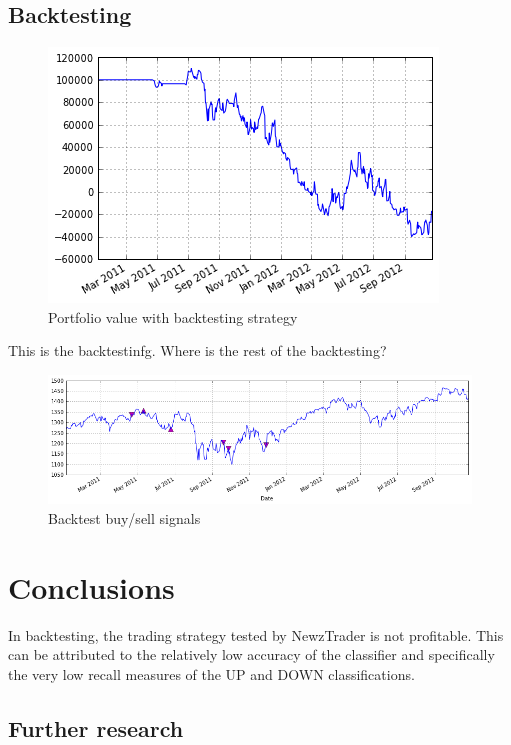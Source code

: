 \documentclass[]{article}
\begin{document}
\subsection{Backtesting}
\begin{figure}
\centering
\includegraphics[scale=0.6]{paper/img/backtestPortValue.png}
\caption{Portfolio value with backtesting strategy}
\end{figure}

This is the backtestinfg. Where is the rest of the backtesting?
\begin{figure}
\centering
\includegraphics[scale=0.6]{paper/img/backtestNB.png}
\caption{Backtest buy/sell signals}
\end{figure}

\section{Conclusions}
In backtesting, the trading strategy tested by NewzTrader is not profitable.  This can be attributed to the relatively low accuracy of the classifier and specifically the very low recall measures of the UP and DOWN classifications.  

\subsection{Further research}
\end{document}

